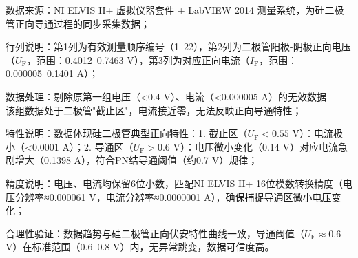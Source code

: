 \documentclass[11pt]{article}
\begin{document}
\begin{table}[htbp]
\begin{threeparttable}
    \begin{tablenotes}
      \item[1] 数据来源：NI ELVIS II+ 虚拟仪器套件 + LabVIEW 2014 测量系统，为硅二极管正向导通过程的同步采集数据；
      \item[2] 行列说明：第1列为有效测量顺序编号（1~22），第2列为二极管阳极-阴极正向电压（$U_{\text{F}}$，范围：0.4012~0.7463 V），第3列为对应正向电流（$I_{\text{F}}$，范围：0.000005~0.1401 A）；
      
      \item[3] 数据处理：剔除原第一组电压（<0.4 V）、电流（<0.000005 A）的无效数据——该组数据处于二极管"截止区"，电流接近零，无法反映正向导通特性；
      \item[4] 特性说明：数据体现硅二极管典型正向特性：1. 截止区（$U_{\text{F}}<0.55$ V）：电流极小（<0.0001 A）；2. 导通区（$U_{\text{F}}>0.6$ V）：电压微小变化（0.14 V）对应电流急剧增大（0.1398 A），符合PN结导通阈值（约0.7 V）规律；
      
      \item[5] 精度说明：电压、电流均保留6位小数，匹配NI ELVIS II+ 16位模数转换精度（电压分辨率≈0.000061 V，电流分辨率≈0.0000001 A），确保捕捉导通区微小电压变化；
      
      \item[6] 合理性验证：数据趋势与硅二极管正向伏安特性曲线一致，导通阈值（$U_{\text{F}}≈0.6$ V）在标准范围（0.6~0.8 V）内，无异常跳变，数据可信度高。
    \end{tablenotes}
  \end{threeparttable}
\end{table}
\end{document}
